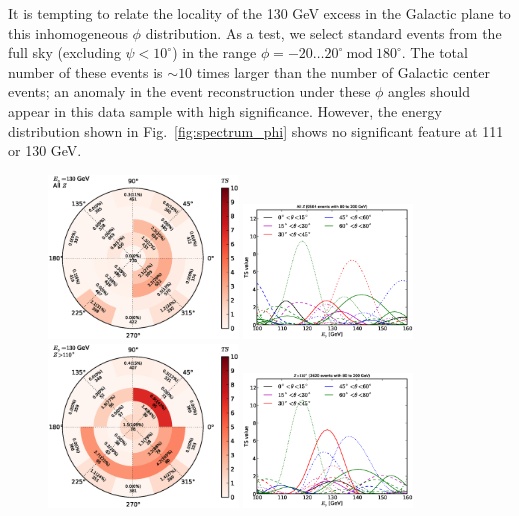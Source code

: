 \documentclass[aps,twocolumn,prd,superscriptaddress,showpacs,nofootinbib,fixfloat]{revtex4}
\begin{document}
It is tempting to relate the locality of the 130 GeV excess
in the Galactic plane to this inhomogeneous $\phi$
distribution. As a test, we select standard events from the
full sky (excluding $\psi < 10^\circ$) in the range $\phi=
-20\dots20^\circ\ \text{mod}\ 180^\circ$. The total number
of these events is $\sim10$ times larger than the number of
Galactic center events; an anomaly in the event
reconstruction under these $\phi$ angles should appear in
this data sample with high significance.  However, the
energy distribution shown in Fig.~\ref{fig:spectrum_phi}
shows no significant feature at 111 or 130 GeV.

\begin{figure}
  \centering
  \includegraphics[width=0.45\textwidth]{plots/polar_all.eps}
  \includegraphics[width=0.40\textwidth]{plots/scan_all.eps}
  \includegraphics[width=0.45\textwidth]{plots/polar_z.GT.110.eps}
  \includegraphics[width=0.40\textwidth]{plots/scan_z.GT.110.eps}

\end{figure}
\end{document}
